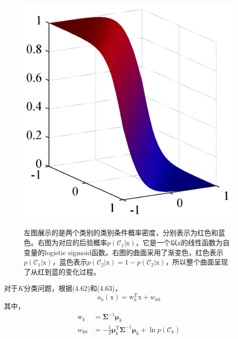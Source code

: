 \documentclass[b5paper]{book}
\numberwithin{equation}{chapter}
\newcommand {\bx} {\boldsymbol{\mathrm{x}}}
\newcommand {\bw} {\boldsymbol{\mathrm{w}}}
\newcommand {\rmT} {\mathrm{T}}
\newcommand {\bfMu} {\boldsymbol{\mu}}
\newcommand {\bfSigma} {\boldsymbol{\Sigma}}
\newcommand {\calC} {\mathcal{C}}
\begin{document}
{\begin{figure}[H]
\begin{minipage}[t]{0.5\linewidth}
		\label{fig:4-10a}
		\end{minipage}
		\begin{minipage}[t]{0.5\linewidth}
		\centering
		\includegraphics[scale=0.8]{Images/4-10b.png}
		\label{fig:4-10b}
		\end{minipage}
		\caption{左图展示的是两个类别的类别条件概率密度，分别表示为红色和蓝色。右图为对应的后验概率$p(\calC_1|\bx)$，它是一个以$\bx$的线性函数为自变量的logistic sigmoid函数。右图的曲面采用了渐变色，红色表示$p(\calC_1|\bx)$，蓝色表示$p(\calC_2|\bx)=1-p(\calC_2|\bx)$，所以整个曲面呈现了从红到蓝的变化过程。}
	\end{figure}
	\indent 对于$K$分类问题，根据(4.62)和(4.63)，
	\begin{equation}
		a_k(\bx) = \bw_k^{\rmT}\bx + w_{k0}
	\end{equation}
	其中，
	\begin{align}
		\bw_k &= \bfSigma^{-1}\bfMu_k \\
		w_{k0} &= -\frac{1}{2}\bfMu_k^{\rmT}\bfSigma^{-1}\bfMu_k + \ln p(\calC_k)
	\end{align}
	\begin{figure}[ht]
		\begin{minipage}[t]{0.5\linewidth}
		\centering

\end{minipage}
\end{figure}}
\end{document}
